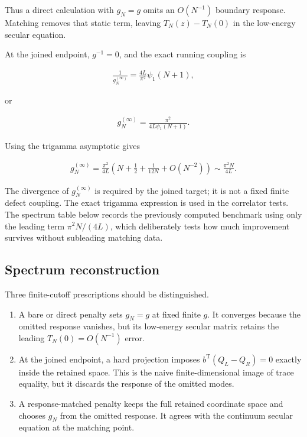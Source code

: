 Thus a direct calculation with $g_N=g$ omits an $O(N^{-1})$ boundary response. Matching removes that static term, leaving $T_N(z)-T_N(0)$ in the low-energy secular equation.

At the joined endpoint, $g^{-1}=0$, and the exact running coupling is

\begin{align}
\frac1{g_N^{(\infty)}}
=\frac{4L}{\pi^2}\psi_1(N+1),
\end{align}

or

\begin{align}
g_N^{(\infty)}
=\frac{\pi^2}{4L\psi_1(N+1)}.
\end{align}

Using the trigamma asymptotic gives

\begin{align}
g_N^{(\infty)}
=\frac{\pi^2}{4L}
\left(
N+\frac12+\frac1{12N}+O(N^{-2})
\right)
\sim\frac{\pi^2N}{4L}.
\end{align}

The divergence of $g_N^{(\infty)}$ is required by the joined target; it is not a fixed finite defect coupling. The exact trigamma expression is used in the correlator tests. The spectrum table below records the previously computed benchmark using only the leading term $\pi^2N/(4L)$, which deliberately tests how much improvement survives without subleading matching data.

\subsection{Spectrum reconstruction}\label{subsec:interval-spectrum}

Three finite-cutoff prescriptions should be distinguished.

\begin{enumerate}
\def\labelenumi{\arabic{enumi}.}
\tightlist
\item
  A bare or direct penalty sets $g_N=g$ at fixed finite $g$. It converges because the omitted response vanishes, but its low-energy secular matrix retains the leading $T_N(0)=O(N^{-1})$ error.
\item
  At the joined endpoint, a hard projection imposes $b^{\mathrm T}(Q_L-Q_R)=0$ exactly inside the retained space. This is the naive finite-dimensional image of trace equality, but it discards the response of the omitted modes.
\item
  A response-matched penalty keeps the full retained coordinate space and chooses $g_N$ from the omitted response. It agrees with the continuum secular equation at the matching point.
\end{enumerate}

